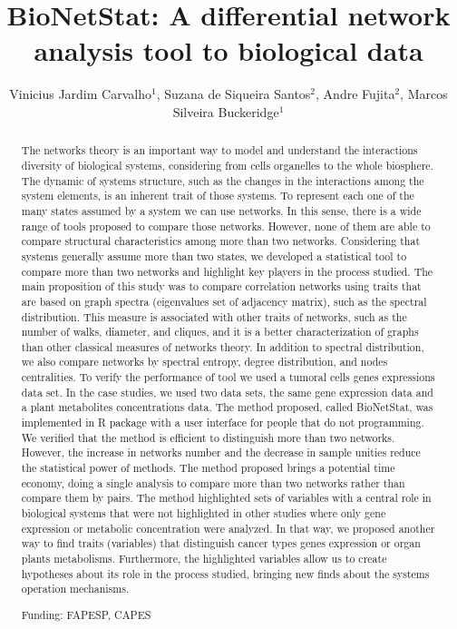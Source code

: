 \documentclass[twoside]{article}
\title{\vspace{-15mm}\fontsize{24pt}{10pt}\selectfont\textbf{BioNetStat: A differential network analysis tool to biological data}} %
\author{Vinicius Jardim Carvalho$^1$, Suzana de Siqueira Santos$^2$, Andre Fujita$^2$, Marcos Silveira Buckeridge$^1$}
\affil{1 USP\\ 2 IME - USP\\ }
\date{}
\begin{document}
\maketitle %

\thispagestyle{fancy} %


\begin{abstract}
The networks theory is an important way to model and understand the interactions diversity of biological systems, considering from cells organelles to the whole biosphere. The dynamic of systems structure, such as the changes in the interactions among the system elements, is an inherent trait of those systems. To represent each one of the many states assumed by a system we can use networks. In this sense, there is a wide range of tools proposed to compare those networks. However, none of them are able to compare structural characteristics among more than two networks. Considering that systems generally assume more than two states, we developed a statistical tool to compare more than two networks and highlight key players in the process studied. The main proposition of this study was to compare correlation networks using traits that are based on graph spectra (eigenvalues set of adjacency matrix), such as the spectral distribution. This measure is associated with other traits of networks, such as the number of walks, diameter, and cliques, and it is a better characterization of graphs than other classical measures of networks theory. In addition to spectral distribution, we also compare networks by spectral entropy, degree distribution, and nodes centralities. To verify the performance of tool we used a tumoral cells genes expressions data set. In the case studies, we used two data sets, the same gene expression data and a plant metabolites concentrations data. The method proposed, called BioNetStat, was implemented in R package with a user interface for people that do not programming. We verified that the method is efficient to distinguish more than two networks. However, the increase in networks number and the decrease in sample unities reduce the statistical power of methods. The method proposed brings a potential time economy, doing a single analysis to compare more than two networks rather than compare them by pairs. The method highlighted sets of variables with a central role in biological systems that were not highlighted in other studies where only gene expression or metabolic concentration were analyzed. In that way, we proposed another way to find traits (variables) that distinguish cancer types genes expression or organ plants metabolisms. Furthermore, the highlighted variables allow us to create hypotheses about its role in the process studied, bringing new finds about the systems operation mechanisms.

Funding: FAPESP, CAPES
\end{abstract}
\end{document}
